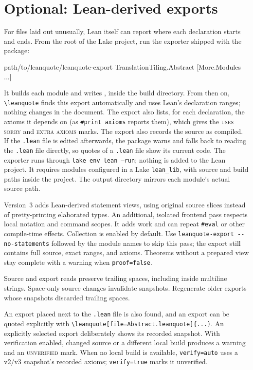 \documentclass[11pt]{article}
\newcommand{\cs}[1]{\texttt{\textbackslash #1}}
\newcommand{\opt}[1]{\texttt{#1}}
\begin{document}
\section{Optional: Lean-derived exports}\label{sec:export}

For files laid out unusually, Lean itself can report where each declaration starts and ends.
From the root of the Lake project, run the exporter shipped with the package:
\begin{latexsrc}
path/to/leanquote/leanquote-export TranslationTiling.Abstract [More.Modules ...]
\end{latexsrc}
It builds each module and writes
, inside the build directory.
From then on, \cs{leanquote} finds this export automatically and uses Lean's declaration ranges;
nothing changes in the document. The export also lists, for each declaration, the axioms it
depends on (as \texttt{\#print axioms} reports them), which gives the \textsc{uses sorry} and
\textsc{extra axioms} marks. The export also records the source as compiled. If the
\texttt{.lean} file is edited afterwards, the package warns and falls back to reading the
\texttt{.lean} file directly, so quotes of a \texttt{.lean} file show its current code.
The exporter runs through \texttt{lake env lean --run}; nothing is added to the Lean project.
It requires modules configured in a Lake \texttt{lean\_lib}, with source and build paths
inside the project. The output directory mirrors each module's actual source path.

Version~3 adds Lean-derived statement views, using original source slices instead
of pretty-printing elaborated types. An additional, isolated frontend pass respects local
notation and command scopes. It adds work and can repeat \texttt{\#eval} or other compile-time
effects. Collection is enabled by default. Use \verb|leanquote-export --no-statements|
followed by the module names to skip
this pass; the export still contains full source, exact ranges, and axioms. Theorems without
a prepared view stay complete with a warning when \opt{proof=false}.

Source and export reads preserve trailing spaces, including inside multiline strings.
Space-only source changes invalidate snapshots. Regenerate older exports whose snapshots
discarded trailing spaces.

An export placed next to the \texttt{.lean} file is also found, and an export can be quoted
explicitly with \verb|\leanquote[file=Abstract.leanquote]{...}|.
An explicitly selected export deliberately shows its recorded snapshot. With verification
enabled, changed source or a different local build produces a warning and an
\textsc{unverified} mark. When no local build
is available, \opt{verify=auto} uses a v2/v3 snapshot's recorded axioms; \opt{verify=true} marks
it unverified.
\end{document}
